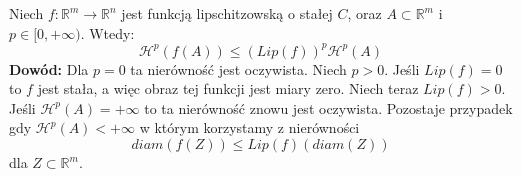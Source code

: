 \begin{lem}
	Niech $f: \mathbb{R}^m \rightarrow \mathbb{R}^n$ jest funkcją lipschitzowską o stałej $C$, oraz $A \subset \mathbb{R}^m$ i $p \in [0, + \infty)$. Wtedy: 
	$$
		\mathcal{H}^p(f(A)) \leq (Lip(f))^p \mathcal{H}^p(A)
	$$
	\textbf{Dowód:}\newline
	Dla $p=0$ ta nierówność jest oczywista. Niech $p>0$. Jeśli $Lip(f) = 0$ to $f$ jest stała, a więc obraz tej funkcji jest miary zero. Niech teraz $Lip(f)>0$. Jeśli $\mathcal{H}^p(A) = +\infty$ to ta nierówność znowu jest oczywista. Pozostaje przypadek gdy $\mathcal{H}^p(A) < +\infty$ w którym korzystamy z nierówności $$
		diam(f(Z)) \leq Lip(f)(diam(Z))
	$$
	dla $Z \subset \mathbb{R}^m$.
\end{lem}